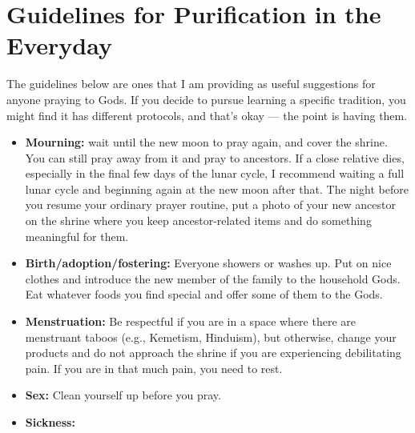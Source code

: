 \documentclass[
]{book}
\providecommand{\tightlist}{%
  \setlength{\itemsep}{0pt}\setlength{\parskip}{0pt}}
\begin{document}
\hypertarget{guidelines-for-purification-in-the-everyday}{%
\section{Guidelines for Purification in the Everyday}\label{guidelines-for-purification-in-the-everyday}}

The guidelines below are ones that I am providing as useful suggestions for anyone praying to Gods. If you decide to pursue learning a specific tradition, you might find it has different protocols, and that's okay --- the point is having them.

\begin{itemize}
\tightlist
\item
  \textbf{Mourning:} wait until the new moon to pray again, and cover the shrine. You can still pray away from it and pray to ancestors. If a close relative dies, especially in the final few days of the lunar cycle, I recommend waiting a full lunar cycle and beginning again at the new moon after that. The night before you resume your ordinary prayer routine, put a photo of your new ancestor on the shrine where you keep ancestor-related items and do something meaningful for them.
\item
  \textbf{Birth/adoption/fostering:} Everyone showers or washes up. Put on nice clothes and introduce the new member of the family to the household Gods. Eat whatever foods you find special and offer some of them to the Gods.
\item
  \textbf{Menstruation:} Be respectful if you are in a space where there are menstruant taboos (e.g., Kemetism, Hinduism), but otherwise, change your products and do not approach the shrine if you are experiencing debilitating pain. If you are in that much pain, you need to rest.
\item
  \textbf{Sex:} Clean yourself up before you pray.
\item
  \textbf{Sickness:}


\end{itemize}
\end{document}
